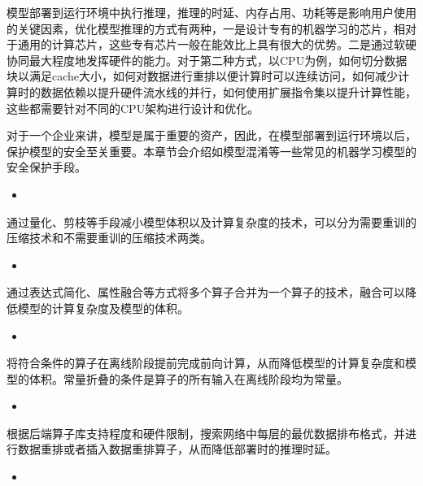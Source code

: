 \documentclass[letterpaper,10pt,english]{sphinxmanual}
\begin{document}
\sphinxAtStartPar
模型部署到运行环境中执行推理，推理的时延、内存占用、功耗等是影响用户使用的关键因素，优化模型推理的方式有两种，一是设计专有的机器学习的芯片，相对于通用的计算芯片，这些专有芯片一般在能效比上具有很大的优势。二是通过软硬协同最大程度地发挥硬件的能力。对于第二种方式，以CPU为例，如何切分数据块以满足cache大小，如何对数据进行重排以便计算时可以连续访问，如何减少计算时的数据依赖以提升硬件流水线的并行，如何使用扩展指令集以提升计算性能，这些都需要针对不同的CPU架构进行设计和优化。

\sphinxAtStartPar
对于一个企业来讲，模型是属于重要的资产，因此，在模型部署到运行环境以后，保护模型的安全至关重要。本章节会介绍如模型混淆等一些常见的机器学习模型的安全保护手段。
\begin{itemize}
\item {} 
\sphinxAtStartPar
{}

\end{itemize}

\sphinxAtStartPar
通过量化、剪枝等手段减小模型体积以及计算复杂度的技术，可以分为需要重训的压缩技术和不需要重训的压缩技术两类。
\begin{itemize}
\item {} 
\sphinxAtStartPar
{}

\end{itemize}

\sphinxAtStartPar
通过表达式简化、属性融合等方式将多个算子合并为一个算子的技术，融合可以降低模型的计算复杂度及模型的体积。
\begin{itemize}
\item {} 
\sphinxAtStartPar
{}

\end{itemize}

\sphinxAtStartPar
将符合条件的算子在离线阶段提前完成前向计算，从而降低模型的计算复杂度和模型的体积。常量折叠的条件是算子的所有输入在离线阶段均为常量。
\begin{itemize}
\item {} 
\sphinxAtStartPar
{}

\end{itemize}

\sphinxAtStartPar
根据后端算子库支持程度和硬件限制，搜索网络中每层的最优数据排布格式，并进行数据重排或者插入数据重排算子，从而降低部署时的推理时延。
\begin{itemize}
\item {} 
\sphinxAtStartPar
{}

\end{itemize}
\end{document}

